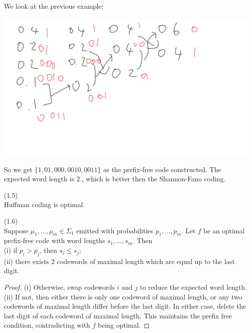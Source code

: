 \documentclass[a4paper]{article}
\begin{document}
\begin{eg}
We look at the previous example:

\includegraphics[scale=0.6]{image/CC_03.png}

So we get $\{1,01,000,0010,0011\}$ as the prefix-free code constructed. The expected word length is $2.$, which is better then the Shannon-Fano coding.
\end{eg}

\begin{thm} (1.5)\\
Huffman coding is optimal.
\end{thm}

\begin{lemma} (1.6) \\
Suppose $\mu_1,...,\mu_m \in \Sigma_1$ emitted with probabilities $p_1,...,p_m$. Let $f$ be an optimal prefix-free code with word lengths $s_1,...,s_m$. Then\\
(i) if $p_i > p_j$, then $s_i \leq s_j$;\\
(ii) there exists 2 codewords of maximal length which are equal up to the last digit.\\
\begin{proof}
(i) Otherwise, swap codewords $i$ and $j$ to reduce the expected word length.\\
(ii) If not, then either there is only one codeword of maximal length, or any two codewords of maximal length differ before the last digit. In either case, delete the last digit of each codeword of maximal length. This maintains the prefix free condition, contradicting with $f$ being optimal.
\end{proof}
\end{lemma}
\end{document}
